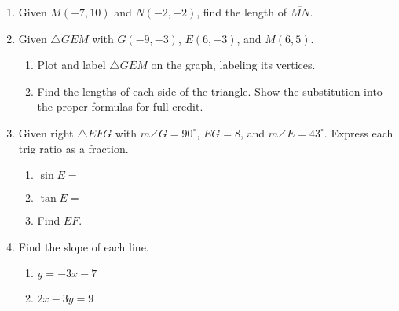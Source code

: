 \documentclass[12pt, oneside]{article}
\begin{document}
\begin{enumerate}
\newpage

  \item Given $M(-7,10)$ and $N(-2,-2)$, find the length of $\overline{MN}$.
      \vspace{5cm}

  \item Given $\triangle GEM$ with $G(-9, -3)$, $E(6, -3)$, and $M(6, 5)$.
    \begin{enumerate}
      \item Plot and label $\triangle GEM$ on the graph, labeling its vertices.
      \item Find the lengths of each side of the triangle. Show the substitution into the proper formulas for full credit.
    \end{enumerate}
    \vspace{3cm}


\newpage
\item Given right $\triangle EFG$ with $m\angle G=90^\circ$, $EG=8$, and $m\angle E=43^\circ$. Express each trig ratio as a fraction.  \vspace{0.5cm}
\begin{multicols}{2}
  \begin{enumerate}
    \item $\sin E=$ \vspace{0.8cm}
    \item $\tan E=$ \vspace{0.8cm}
    \item Find $EF$.
  \end{enumerate}
  \begin{center}
      \vspace{2cm}
  \end{center}
\end{multicols}
\vspace{3cm}

  \item Find the slope of each line.
  \begin{multicols}{2}
    \begin{enumerate}
      \item $y=-3x-7$
      \item $2x-3y=9$
    \end{enumerate}
  \end{multicols} \vspace{3cm}


\end{enumerate}
\end{document}

